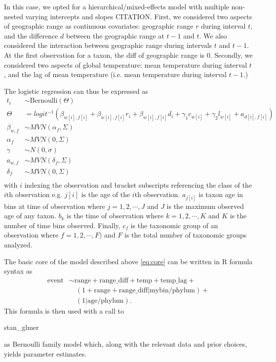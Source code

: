 \documentclass[12pt,letterpaper]{article}
\begin{document}
In this case, we opted for a hierarchical/mixed-effects model with multiple non-nested varying intercepts and slopes CITATION. First, we considered two aspects of geographic range as continuous covariates: geographic range \(r\) during interval \(t\), and the difference \(d\) between the geographic range at \(t - 1\) and \(t\). We also considered the interaction between geographic range during intervals \(t\) and \(t - 1\). At the first observation for a taxon, the diff of geographic range is 0. Secondly, we considered two aspects of global temperature: mean temperature during interval \(t\), and the lag of mean temperature (i.e. mean temperature during interval \(t - 1\).)

The logistic regression can thus be expressed as 
\begin{equation}
  \begin{aligned}
    t_{i} &\sim \text{Bernoulli}(\Theta) \\
    \Theta &= logit^{-1}(\beta_{w[i], f[i]} + \beta_{w[i], f[i]} r_{i} + \beta_{w[i], f[i]} d_{i} + \gamma_{1} c_{w[i]} + \gamma_{2} l_{w[i]} + a_{d[i], f[i]}) \\
    \beta_{w, f} &\sim MVN(\alpha_{f}, \Sigma) \\
    \alpha_{f} &\sim MVN(0, \Sigma) \\
    \gamma &\sim N(0, \sigma) \\
    a_{w, f} &\sim MVN(\delta_{f}, \Sigma) \\
    \delta_{f} &\sim MVN(0, \Sigma) \\
  \end{aligned}
  \label{eq:core}
\end{equation}
with \(i\) indexing the observation and bracket subscripts referencing the class of the \(i\)th observation e.g. \(j[i]\) is the age of the \(i\)th observation. \(a_{j[i]}\) is taxon age in bins at time of observation where \(j = 1, 2, \cdots, J\) and \(J\) is the maximum observed age of any taxon. \(b_{k}\) is the time of observation where \(k = 1, 2, \cdots, K\) and \(K\) is the number of time bins observed. Finally, \(c_{f}\) is the taxonomic group of an observation where \(f = 1, 2, \cdots, F)\) and \(F\) is the total number of taxonomic groups analyzed.



The basic core of the model described above \ref{eq:core} can be written in R formula syntax as
\begin{equation}
  \begin{aligned}
    \text{event} &\sim \text{range} + \text{range\_diff} + \text{temp} + \text{temp\_lag} + \\
    &\quad (1 + \text{range} + \text{range\_diff} | \text{mybin} / \text{phylum}) + \\
    &\quad (1 | \text{age} / \text{phylum}).
  \end{aligned}
\end{equation}
This formula is then used with a call to \begin{texttt} stan\_glmer \end{texttt} as Bernoulli family model which, along with the relevant data and prior choices, yields parameter estimates.
\end{document}
